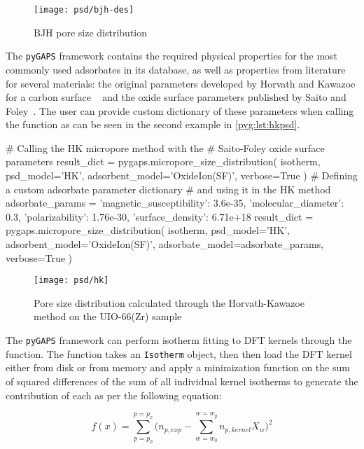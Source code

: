 \begin{figure}[!htb]
	\centering
	\texttt{[image: psd/bjh-des]}
	\caption{BJH pore size distribution}%
	\label{pyg:fgr:bjhplot}
\end{figure}



The \texttt{pyGAPS} framework contains the required physical properties
for the most commonly used adsorbates in its database, as well as
properties from literature for several materials:
the original parameters developed by Horvath and Kawazoe for a carbon surface
~\cite{horvathMethodCalculationEffective1983} and the oxide
surface parameters published by Saito and
Foley~\cite{saitoCurvatureParametricSensitivity1991}.
The user can provide custom dictionary of these parameters when calling the
function as can be seen in the second example in \autoref{pyg:lst:hkpsd}.

\begin{python}[float=htb, caption={Using the HK method for PSD},%
    label={pyg:lst:hkpsd}]
# Calling the HK micropore method with the 
# Saito-Foley oxide surface parameters
result_dict = pygaps.micropore_size_distribution(
    isotherm,
    psd_model='HK',
    adsorbent_model='OxideIon(SF)',
    verbose=True
)
# Defining a custom adsorbate parameter dictionary 
# and using it in the HK method
adsorbate_params = {
    'magnetic_susceptibility': 3.6e-35,
    'molecular_diameter': 0.3,
    'polarizability': 1.76e-30,
    'surface_density': 6.71e+18
}
result_dict = pygaps.micropore_size_distribution(
    isotherm,
    psd_model='HK',
    adsorbent_model='OxideIon(SF)',
    adsorbate_model=adsorbate_params,
    verbose=True
)
\end{python}

\begin{figure}[!htb]
	\texttt{[image: psd/hk]}
	\caption{Pore size distribution calculated through the Horvath-Kawazoe method on the UIO-66(Zr) sample}%
	\label{fig:pyg:fig:hk}
\end{figure}


The \texttt{pyGAPS} framework can perform isotherm fitting to 
DFT kernels through the  function. 
The function takes an \texttt{Isotherm} object, then 
then load the DFT kernel either from disk or from memory and 
apply a minimization function on the sum of squared differences 
of the sum of all individual kernel isotherms to generate 
the contribution of each as per the following equation:

\begin{equation}
	f(x) = \sum_{p=p_0}^{p=p_x} \Big(n_{p,exp} - \sum_{w=w_0}^{w=w_y} n_{p, kernel} X_w \Big)^2
\end{equation}

